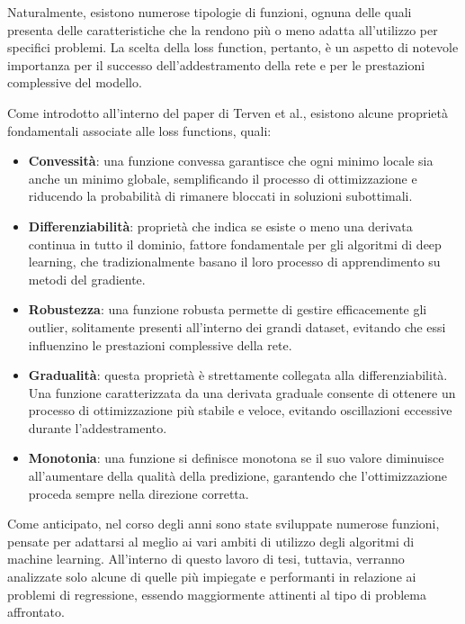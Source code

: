 Naturalmente, esistono numerose tipologie di funzioni, ognuna delle quali presenta delle caratteristiche che la rendono più o meno adatta all'utilizzo per specifici problemi. La scelta della loss function, pertanto, è un aspetto di notevole importanza per il successo dell'addestramento della rete e per le prestazioni complessive del modello.

Come introdotto all'interno del paper di Terven et al.\cite{LF_review_Terven}, esistono alcune proprietà fondamentali associate alle loss functions, quali:

    \begin{itemize}

        \item \textbf{Convessità}: una funzione convessa garantisce che ogni minimo locale sia anche un minimo globale, semplificando il processo di ottimizzazione e riducendo la probabilità di rimanere bloccati in soluzioni subottimali.

        \item \textbf{Differenziabilità}: proprietà che indica se esiste o meno una derivata continua in tutto il dominio, fattore fondamentale per gli algoritmi di deep learning, che tradizionalmente basano il loro processo di apprendimento su metodi del gradiente.

        \item \textbf{Robustezza}: una funzione robusta permette di gestire efficacemente gli outlier, solitamente presenti all'interno dei grandi dataset, evitando che essi influenzino le prestazioni complessive della rete.

        \item \textbf{Gradualità}: questa proprietà è strettamente collegata alla differenziabilità. Una funzione caratterizzata da una derivata graduale consente di ottenere un processo di ottimizzazione più stabile e veloce, evitando oscillazioni eccessive durante l'addestramento.

        \item \textbf{Monotonia}: una funzione si definisce monotona se il suo valore diminuisce all'aumentare della qualità della predizione, garantendo che l'ottimizzazione proceda sempre nella direzione corretta.

    \end{itemize}

Come anticipato, nel corso degli anni sono state sviluppate numerose funzioni, pensate per adattarsi al meglio ai vari ambiti di utilizzo degli algoritmi di machine learning. All'interno di questo lavoro di tesi, tuttavia, verranno analizzate solo alcune di quelle più impiegate e performanti in relazione ai problemi di regressione, essendo maggiormente attinenti al tipo di problema affrontato. 

